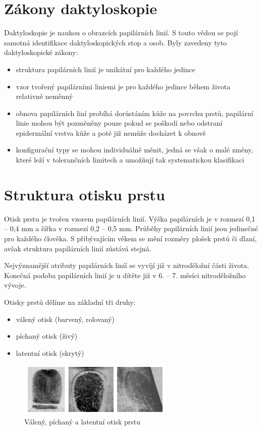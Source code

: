 \section{Zákony daktyloskopie}
Daktyloskopie je naukou o obrazcích papilárních linií. S touto vědou se pojí samotná identifikace daktyloskopických stop a osob. \cite{PolicieDaktyloskopie} Byly zavedeny tyto daktyloskopické zákony:
\begin{itemize}
    \item struktura papilárních linií je unikátní pro každého jedince
    \item vzor tvořený papilárními liniemi je pro každého jedince během života relativně neměnný
    \item obnova papilárních liní probíhá dorůstáním kůže na povrchu prstů, papilární linie mohou být pozměněny pouze pokud se poškodí nebo odstraní epidermální vrstva kůže a poté již nemůže docházet k obnově
    \item konfigurační typy se mohou individuálně měnit, jedná se však o malé změny, které leží v tolerančních limitech a umožňují tak systematickou klasifikaci \cite{Drahansky}
\end{itemize}

\section{Struktura otisku prstu}
Otisk prstu je tvořen vzorem papilárních linií. Výška papilárních je v rozmezí 0,1 -- 0,4 mm a šířka v rozmezí 0,2 -- 0,5 mm. \cite{Drahansky} Průběhy papilárních linií jsou jedinečné pro každého člověka. S přibývajícím věkem se mění rozměry plošek prstů či dlaní, avšak struktura papilárních linií zůstává stejná.

Nejvýznamější atributy papilárních liníí se vyvíjí již v nitroděložní části života. Konečná podoba papilárních linií je u dítěte již v 6. -- 7. měsíci nitroděložního vývoje. \cite{DrahanskyBrezinova}

Otisky prstů dělíme na základní tři druhy: 
\begin{itemize}
\item válený otisk (barvený, rolovaný)
\item píchaný otisk (živý)
\item latentní otisk (skrytý) \cite{Drahansky}
\end{itemize}

\begin{figure}[!htbp]
    \centering
    \includegraphics[width=280px]{obrazky-figures/druhyotisk.png}
    \caption{Válený, píchaný a latentní otisk prstu \cite{Drahansky}}
\end{figure}

